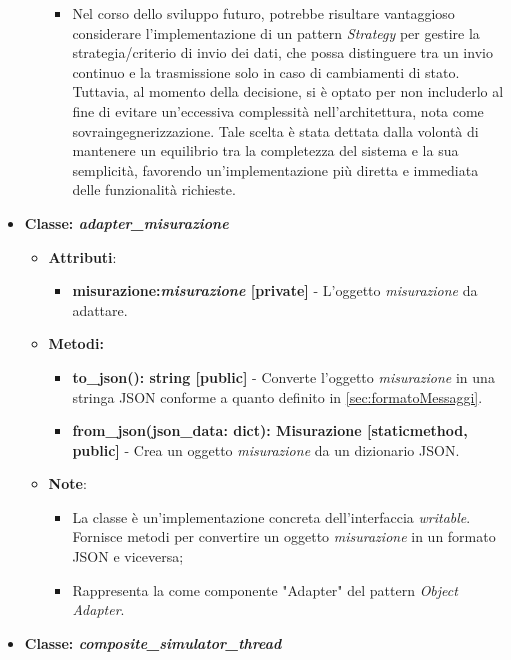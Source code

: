 \begin{itemize}
\begin{itemize}
\begin{itemize}
            \item Nel corso dello sviluppo futuro, potrebbe risultare vantaggioso considerare l'implementazione di un pattern \textit{Strategy} per gestire la strategia/criterio di invio dei dati, che possa distinguere tra un invio continuo e la trasmissione solo in caso di cambiamenti di stato. Tuttavia, al momento della decisione, si è optato per non includerlo al fine di evitare un'eccessiva complessità nell'architettura, nota come sovraingegnerizzazione. Tale scelta è stata dettata dalla volontà di mantenere un equilibrio tra la completezza del sistema e la sua semplicità, favorendo un'implementazione più diretta e immediata delle funzionalità richieste.
        \end{itemize}
    \end{itemize}
    \item{\textbf{Classe: \textit{adapter\_misurazione}}}
    \begin{itemize}
        \item\textbf{Attributi}:
        \begin{itemize}
            \item \textbf{misurazione:\textit{misurazione} [private]} - L'oggetto \textit{misurazione} da adattare.
        \end{itemize}
        \item \textbf{Metodi: }
        \begin{itemize}
            \item \textbf{to\_json(): string [public]} - Converte l'oggetto \textit{misurazione} in una stringa JSON conforme a quanto definito in \ref{sec:formatoMessaggi}.
            \item \textbf{from\_json(json\_data: dict): Misurazione [staticmethod, public]} - Crea un oggetto \textit{misurazione} da un dizionario JSON.
        \end{itemize}
        \item\textbf{Note}:
        \begin{itemize}
            \item La classe è un'implementazione concreta dell'interfaccia \textit{writable}. Fornisce metodi per convertire un oggetto \textit{misurazione} in un formato JSON e viceversa;
            \item Rappresenta la come componente "Adapter" del pattern \textit{Object Adapter}.
        \end{itemize}
    \end{itemize}
    \item{\textbf{Classe: \textit{composite\_simulator\_thread}}}

\end{itemize}

